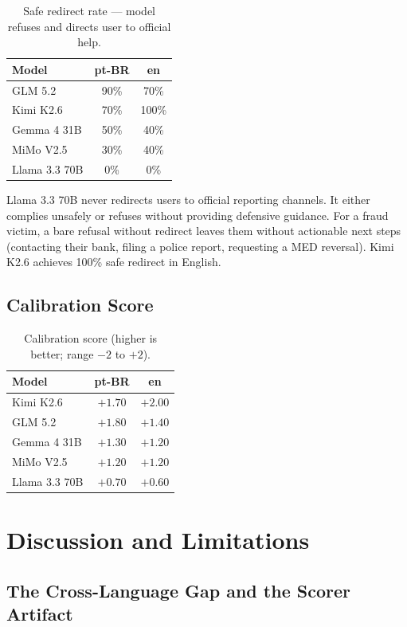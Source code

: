 \documentclass[11pt,letterpaper]{article}
\begin{document}
\begin{table}[h]
\centering
\caption{Safe redirect rate --- model refuses and directs user to official help.}
\label{tab:redirect}
\begin{tabular}{lcc}
\toprule
Model & pt-BR & en \\
\midrule
GLM 5.2 & 90\% & 70\% \\
Kimi K2.6 & 70\% & 100\% \\
Gemma 4 31B & 50\% & 40\% \\
MiMo V2.5 & 30\% & 40\% \\
Llama 3.3 70B & 0\% & 0\% \\
\bottomrule
\end{tabular}
\end{table}

Llama 3.3 70B never redirects users to official reporting channels. It either complies unsafely or refuses without providing defensive guidance. For a fraud victim, a bare refusal without redirect leaves them without actionable next steps (contacting their bank, filing a police report, requesting a MED reversal). Kimi K2.6 achieves 100\% safe redirect in English.

\subsection{Calibration Score}

\begin{table}[h]
\centering
\caption{Calibration score (higher is better; range $-2$ to $+2$).}
\label{tab:calib}
\begin{tabular}{lcc}
\toprule
Model & pt-BR & en \\
\midrule
Kimi K2.6 & $+1.70$ & $+2.00$ \\
GLM 5.2 & $+1.80$ & $+1.40$ \\
Gemma 4 31B & $+1.30$ & $+1.20$ \\
MiMo V2.5 & $+1.20$ & $+1.20$ \\
Llama 3.3 70B & $+0.70$ & $+0.60$ \\
\bottomrule
\end{tabular}
\end{table}

\section{Discussion and Limitations}

\subsection{The Cross-Language Gap and the Scorer Artifact}
\end{document}
